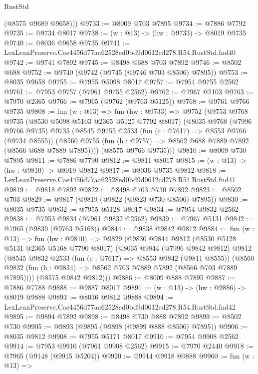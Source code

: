 \begin{lexlean}{RustStd}
\begin{coremodule}
        (@8575 @9689 @9658)))
@9733 := @8009 @703 @7895
@9734 := @7886 @7792
@9735 := @9734 @8017
@9738 := (w : @13) -> (hw : @9733) -> @8019 @9735
@9740 := @8036 @9658 @9735
@9741 := LexLeanPreserve.Cae4456d77aa62528ed0bd9d0612cd278.R54.RustStd.fnd40
@9742 := @9741 @7892
@9745 := @8498 @688 @703 @7892
@9746 := @8502 @688
@9752 := @9740 (@9742 (@9745 (@9746 @703 @8506) @7895))
@9753 := @8035 @9658
@9755 := @7955 @5098 @8017
@9757 := @7954 @9755 @2562
@9761 := @7953 @9757 (@7961 @9755 @2562)
@9762 := @7967 @5103
@9763 := @7970 @2365
@9766 := @7965 (@9762 (@9763 @5125))
@9768 := @9761 @9766 @9735
@9808 := fun (w : @13) =>
  fun (hw : @9733) =>
  @9752
    (@9753
      @9768
      @9735
      (@8530 @5098 @5103 @2365 @5125 @7792 @8017)
      (@8035
        @9768
        (@7996 @9766 @9735)
        @9735
        (@8545
          @9755
          @2533
          (fun (c : @7617) => @8553 @9766 (@9734 @8555))
          (@8560 @9755 (fun (h : @9757) => @8562 @688 @7889 @7892 (@8566 @688 @7889 @7895))))
        (@8575 @9766 @9735)))
@9810 := @8009 @730 @7895
@9811 := @7886 @7790
@9812 := @9811 @8017
@9815 := (w : @13) -> (hw : @9810) -> @8019 @9812
@9817 := @8036 @9735 @9812
@9818 := LexLeanPreserve.Cae4456d77aa62528ed0bd9d0612cd278.R54.RustStd.fnd41
@9819 := @9818 @7892
@9822 := @8498 @703 @730 @7892
@9823 := @8502 @703
@9829 := @9817 (@9819 (@9822 (@9823 @730 @8506) @7895))
@9830 := @8035 @9735
@9832 := @7955 @5128 @8017
@9834 := @7954 @9832 @2562
@9838 := @7953 @9834 (@7961 @9832 @2562)
@9839 := @7967 @5131
@9842 := @7965 (@9839 (@9763 @5168))
@9844 := @9838 @9842 @9812
@9884 := fun (w : @13) =>
  fun (hw : @9810) =>
  @9829
    (@9830
      @9844
      @9812
      (@8530 @5128 @5131 @2365 @5168 @7790 @8017)
      (@8035
        @9844
        (@7996 @9842 @9812)
        @9812
        (@8545
          @9832
          @2533
          (fun (c : @7617) => @8553 @9842 (@9811 @8555))
          (@8560 @9832 (fun (h : @9834) => @8562 @703 @7889 @7892 (@8566 @703 @7889 @7895))))
        (@8575 @9842 @9812)))
@9886 := @8009 @888 @7895
@9887 := @7886 @7788
@9888 := @9887 @8017
@9891 := (w : @13) -> (hw : @9886) -> @8019 @9888
@9893 := @8036 @9812 @9888
@9894 := LexLeanPreserve.Cae4456d77aa62528ed0bd9d0612cd278.R54.RustStd.fnd42
@9895 := @9894 @7892
@9898 := @8498 @730 @888 @7892
@9899 := @8502 @730
@9905 := @9893 (@9895 (@9898 (@9899 @888 @8506) @7895))
@9906 := @8035 @9812
@9908 := @7955 @5171 @8017
@9910 := @7954 @9908 @2562
@9914 := @7953 @9910 (@7961 @9908 @2562)
@9915 := @7970 @2440
@9918 := @7965 (@9148 (@9915 @5204))
@9920 := @9914 @9918 @9888
@9960 := fun (w : @13) =>

\end{coremodule}
\end{lexlean}
